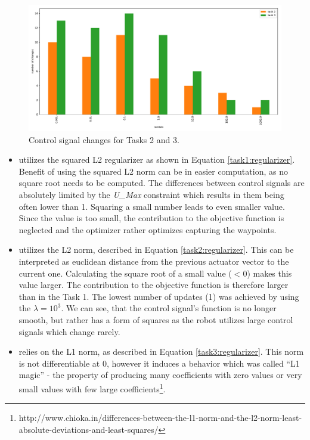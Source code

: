 \begin{figure}[!htb]
    \centering
    \includegraphics[width=\linewidth]{part1/notebooks/task_2_3_signal_changes.pdf}
    \caption{Control signal changes for Tasks 2 and 3.}
    \label{fig:task4:changes}
\end{figure}


\begin{itemize}
    \item[\textbf{Task 1}] utilizes the squared L2 regularizer as shown in Equation \ref{task1:regularizer}. Benefit of using the squared L2 norm can be in easier computation, as no square root needs to be computed. The differences between control signals are absolutely limited by the \textit{U\_Max} constraint which results in them being often lower than 1. Squaring a small number leads to even smaller value. Since the value is too small, the contribution to the objective function is neglected and the optimizer rather optimizes capturing the waypoints. 
    \item[\textbf{Task 2}] utilizes the L2 norm, described in Equation \ref{task2:regularizer}. This can be interpreted as euclidean distance from the previous actuator vector to the current one. Calculating the square root of a small value ($<0$) makes this value larger. The contribution to the objective function is therefore larger than in the Task 1. The lowest number of updates (1) was achieved by using the $\lambda=10^3$. We can see, that the control signal's function is no longer smooth, but rather has a form of squares as the robot utilizes large control signals which change rarely.
    \item[\textbf{Task 3}] relies on the L1 norm, as described in Equation \ref{task3:regularizer}. This norm is not differentiable at 0, however it induces a behavior which was called ``L1 magic'' - the property of producing many coefficients with zero values or very small values with few large coefficients\footnote{http://www.chioka.in/differences-between-the-l1-norm-and-the-l2-norm-least-absolute-deviations-and-least-squares/}.
\end{itemize}

